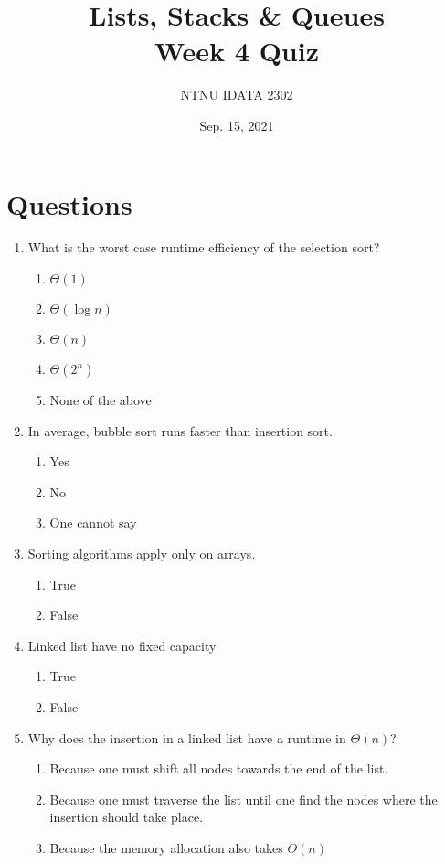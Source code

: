 \documentclass[11pt]{article}
\author{NTNU IDATA 2302}
\date{Sep. 15, 2021}
\title{Lists, Stacks \& Queues\\\medskip
\large Week 4 Quiz}
\begin{document}
\maketitle


\section{Questions}
\label{sec:orgc2b68a2}

\begin{enumerate}
\item What is the worst case runtime efficiency of the selection sort?
\begin{enumerate}
\item \(\Theta(1)\)
\item \(\Theta(\log n)\)
\item \(\Theta(n)\)
\item \(\Theta(2^n)\)
\item None of the above
\end{enumerate}

\item In average, bubble sort runs faster than insertion sort.
\begin{enumerate}
\item Yes
\item No
\item One cannot say
\end{enumerate}

\item Sorting algorithms apply only on arrays.
\begin{enumerate}
\item True
\item False
\end{enumerate}

\item Linked list have no fixed capacity
\begin{enumerate}
\item True
\item False
\end{enumerate}

\item Why does the insertion in a linked list have a runtime in \(\Theta(n)\)?
\begin{enumerate}
\item Because one must shift all nodes towards the end of the list.
\item Because one must traverse the list until one find the nodes
where the insertion should take place.
\item Because the memory allocation also takes \(\Theta(n)\)
\end{enumerate}


\end{enumerate}
\end{document}
